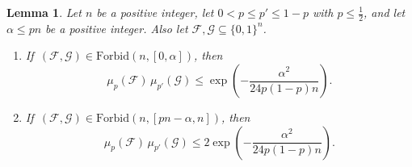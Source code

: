 \documentclass[10pt]{amsart}
\newtheorem{lem}[thm]{Lemma}
\theoremstyle{remark}
\newcommand{\mik}{\leqslant}
\newcommand{\Fcal}{\mathcal{F}}
\newcommand{\Gcal}{\mathcal{G}}
\newcommand{\Forb}[2]{\mathrm{Forbid}\left(#1,#2\right)}
\begin{document}
\begin{lem} \label{l3.3}
Let $n$ be a positive integer, let $0<p\mik p'\mik 1-p$ with $p\mik \frac12$, and let $\alpha\mik pn$ be
a positive integer. Also let $\Fcal,\Gcal\subseteq \{0,1\}^n$.
\begin{enumerate}
\item[(i)] If\, $(\Fcal,\Gcal)\in\Forb{n}{[0,\alpha]}$, then
\begin{equation}\label{e3.6}
\mu_p(\Fcal)\,\mu_{p'}(\Gcal)\mik\exp\left(-\frac{\alpha^2}{24p(1-p)n}\right).
\end{equation}
\item[(ii)] If\, $(\Fcal,\Gcal)\in\Forb{n}{[pn-\alpha,n]}$, then
\begin{equation}\label{e3.7}
\mu_{p}(\Fcal)\,\mu_{p'}(\Gcal)\mik 2\exp\left(-\frac{\alpha^2}{24p(1-p)n}\right).
\end{equation}
\end{enumerate}
\end{lem}
\end{document}
